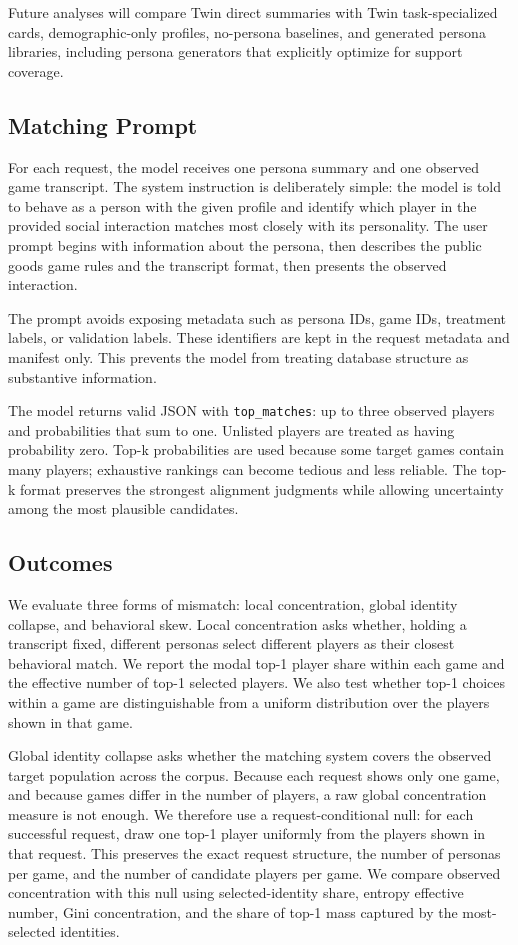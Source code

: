 \documentclass[11pt]{article}
\begin{document}
Future analyses will compare Twin direct summaries with Twin task-specialized cards, demographic-only profiles, no-persona baselines, and generated persona libraries, including persona generators that explicitly optimize for support coverage.

\subsection{Matching Prompt}

For each request, the model receives one persona summary and one observed game transcript. The system instruction is deliberately simple: the model is told to behave as a person with the given profile and identify which player in the provided social interaction matches most closely with its personality. The user prompt begins with information about the persona, then describes the public goods game rules and the transcript format, then presents the observed interaction.

The prompt avoids exposing metadata such as persona IDs, game IDs, treatment labels, or validation labels. These identifiers are kept in the request metadata and manifest only. This prevents the model from treating database structure as substantive information.

The model returns valid JSON with \texttt{top\_matches}: up to three observed players and probabilities that sum to one. Unlisted players are treated as having probability zero. Top-k probabilities are used because some target games contain many players; exhaustive rankings can become tedious and less reliable. The top-k format preserves the strongest alignment judgments while allowing uncertainty among the most plausible candidates.

\subsection{Outcomes}

We evaluate three forms of mismatch: local concentration, global identity collapse, and behavioral skew. Local concentration asks whether, holding a transcript fixed, different personas select different players as their closest behavioral match. We report the modal top-1 player share within each game and the effective number of top-1 selected players. We also test whether top-1 choices within a game are distinguishable from a uniform distribution over the players shown in that game.

Global identity collapse asks whether the matching system covers the observed target population across the corpus. Because each request shows only one game, and because games differ in the number of players, a raw global concentration measure is not enough. We therefore use a request-conditional null: for each successful request, draw one top-1 player uniformly from the players shown in that request. This preserves the exact request structure, the number of personas per game, and the number of candidate players per game. We compare observed concentration with this null using selected-identity share, entropy effective number, Gini concentration, and the share of top-1 mass captured by the most-selected identities.
\end{document}
